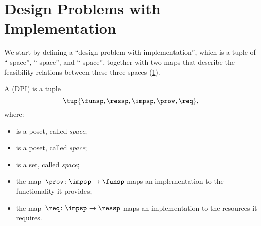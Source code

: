 
\section[DPIs]{Design Problems with Implementation}
\label{sec:Design-Problems}
We start by defining a ``design problem with implementation'', which is a tuple of `` space'', `` space'', and `` space'', together with two maps that describe the feasibility relations between these three spaces (\cref{fig:setup}).

\begin{definition}
    \label{def:DPI}
    A  (DPI) is a tuple
    \begin{equation}
        \tup{\funsp, \ressp, \impsp, \prov,\req},
    \end{equation}
    where:
    \begin{itemize}
        \item \funsp is a poset, called \emph{ space};
        \item \ressp is a poset, called \emph{ space};
        \item \impsp is a set, called \emph{ space};
        \item the map~$\prov\colon\impsp\to\funsp$
              maps an implementation to the functionality it provides;
        \item the map~$\req\colon\impsp\to\ressp$
              maps an implementation to the resources it requires.
    \end{itemize}

\end{definition}

\begin{figure}[h]
    \centering
    \caption{}
    \label{fig:setup}
\end{figure}


